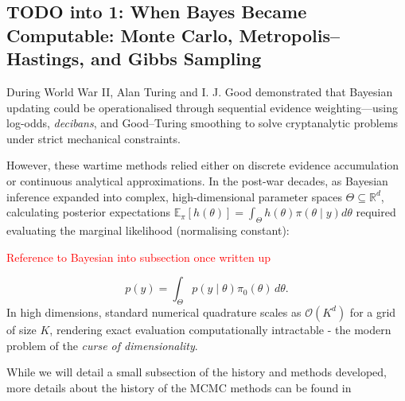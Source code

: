 

\subsection{TODO into 1: When Bayes Became Computable: Monte Carlo, Metropolis--Hastings, and Gibbs Sampling}
\label{sec:mcmc-history}

During World War II, Alan Turing and I. J. Good demonstrated that Bayesian updating could be operationalised through sequential evidence weighting—using log-odds, \emph{decibans}, and Good--Turing smoothing to solve cryptanalytic problems under strict mechanical constraints. 

However, these wartime methods relied either on discrete evidence accumulation or continuous analytical approximations. In the post-war decades, as Bayesian inference expanded into complex, high-dimensional parameter spaces $\Theta \subseteq \mathbb{R}^d$, calculating posterior expectations $\mathbb{E}_\pi[h(\theta)] = \int_\Theta h(\theta)\pi(\theta \mid y)d\theta$ required evaluating the marginal likelihood (normalising constant):

\textcolor{red}{Reference to Bayesian into subsection once written up}

\begin{equation}
    p(y) = \int_{\Theta} p(y \mid \theta)\pi_{0}(\theta)\,d\theta.
    \label{eq:marginal-likelihood}
\end{equation}
In high dimensions, standard numerical quadrature scales as $\mathcal{O}(K^d)$ for a grid of size $K$, rendering exact evaluation computationally intractable - the modern problem of the \emph{curse of dimensionality}.

While we will detail a small subsection of the history and methods developed, more details about the history of the MCMC methods can be found in \cite{robert2011short, grimmett2014probability, wiki:mcmc, wiki:metropolishastings}


